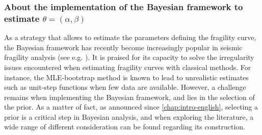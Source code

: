  




\subsubsection{About the implementation of the Bayesian framework to estimate $\theta=(\alpha,\beta)$}

As a strategy that allows to estimate the parameters defining the fragility curve, 
the Bayesian framework has recently become increasingly popular in seismic fragility analysis (see e.g. \cite{gardoni_probabilistic_2002,wang_bayesian_2018,katayama_bayesian-estimation-based_2021,koutsourelakis_assessing_2010,damblin_approche_2014,tadinada_structural_2017,kwag_computationally_2018,jeon_parameterized_2019,tabandeh_physics-based_2020}). 
It is praised for its capacity to solve the irregularity issues encountered when estimating fragility curves with classical methods. For instance, the MLE-bootstrap method is known to lead to unrealistic estimates such as unit-step functions when few data are available.
However, a challenge remains when %
implementing the Bayesian framework, and 
lies in the selection of the prior.
As a matter of fact, as announced since \cref{chap:intro-english}, selecting a prior is a critical step in Bayesian analysis, %
and when exploring the literature, a wide range of different consideration can be found regarding its construction. %
%

